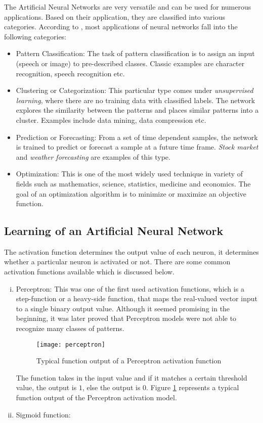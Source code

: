 The Artificial Neural Networks are very versatile and can be used for numerous applications. Based on their application, they are classified into various categories. According to \citet{jain1996artificial},  most applications of neural networks fall into the following categories:\\
\begin{itemize}
\item Pattern Classification: The task of pattern classification is to assign an input (speech or image) to pre-described classes. Classic examples are character recognition, speech recognition etc. 
\item Clustering or Categorization: This particular type comes under \textit{unsupervised learning}, where there are no training data with classified labels. The network explores the similarity between the patterns and places similar patterns into a cluster. Examples include data mining, data compression etc.
\item Prediction or Forecasting: From a set of time dependent samples, the network is trained to predict or forecast a sample at a future time frame. \textit{Stock market} and \textit{weather forecasting} are examples of this type.
\item Optimization: This is one of the most widely used technique in variety of fields such as mathematics, science, statistics, medicine and economics. The goal of an optimization algorithm is to minimize or maximize an objective function.
\end{itemize}
\subsection{Learning of an Artificial Neural Network}
The activation function determines the output value of each neuron, it determines whether a particular neuron is activated or not. There are some common activation functions available which is discussed below.
\begin{enumerate}[(i)]
\item Perceptron: This was one of the first used activation functions, which is a step-function or a heavy-side function, that maps the real-valued vector input	to a single binary output value. Although it seemed promising in the beginning, it was later proved that Perceptron models were not able to recognize many classes of patterns.\\
 \begin{figure}[h!]
 \centering
 \texttt{[image: perceptron]}
 \caption{Typical function output of a Perceptron activation function}
 \label{fig:2.12}
 \end{figure}
The function takes in the input value and if it matches a certain threshold value, the output is $1$, else the output is $0$. Figure \ref{fig:2.12} represents a typical function output of the Perceptron activation model.
\item Sigmoid function: 
\end{enumerate}
      
 










